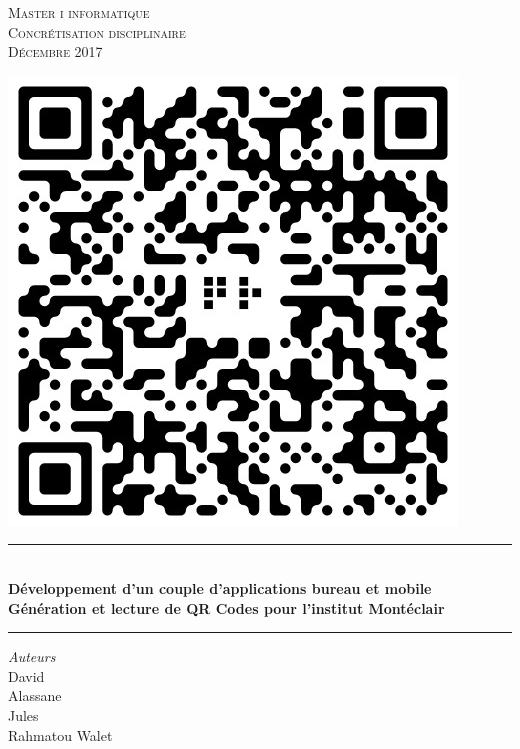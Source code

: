 \documentclass{report}
\begin{document}
\begin{titlepage}
	\centering
	
    \vspace*{1.2 cm}
    
   	\textsc{\LARGE Master i informatique\\Concrétisation disciplinaire\\[0.3cm]\large Décembre 2017}

	\vspace{2.2cm}
    
    
    \includegraphics[scale = 0.29]{img/qr.jpeg}\\[0.5 cm]
	\rule{\linewidth }{0.2 mm} \\[0.15 cm]
    {\LARGE \textbf{Développement d'un couple d'applications bureau et mobile}\\[0.2cm] \large
		\textbf{Génération et lecture de QR Codes pour l'institut Montéclair}}\\
	\rule{\linewidth}{0.2 mm}
       \vspace*{0.1 cm}
	
	\begin{center}
	\vspace{0.3cm}
	
	\emph{Auteurs}\\
	\vspace{0.1cm}
	David \\ 
	Alassane \\
	Jules \\ 
	Rahmatou Walet 
	

\end{center}
\end{titlepage}
\end{document}
